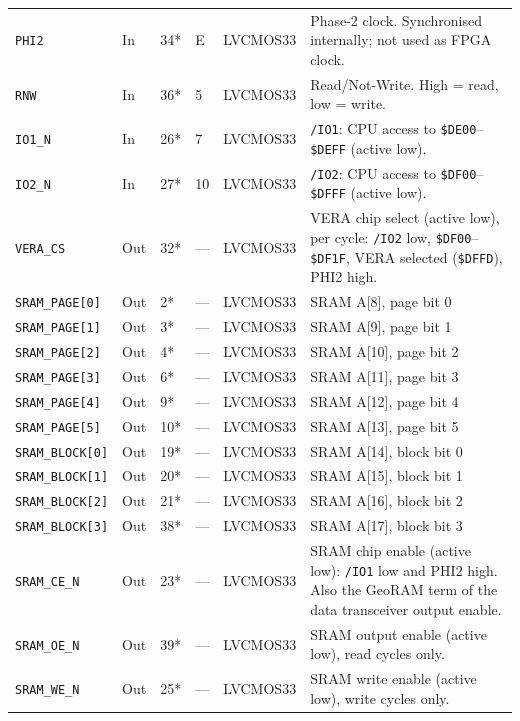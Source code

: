 \documentclass[11pt,a4paper]{article}
\newcommand{\sig}[1]{\texttt{#1}}
\newcommand{\hex}[1]{\texttt{\$#1}}
\begin{document}
\begin{center}
\begin{longtable}{lllllp{4.6cm}}
\sig{PHI2}     & In  & 34* & E  & LVCMOS33 &
    Phase-2 clock. Synchronised internally; not used as FPGA clock. \\
\sig{RNW}      & In  & 36* & 5  & LVCMOS33 &
    Read/Not-Write. High = read, low = write. \\
\sig{IO1\_N}   & In  & 26* & 7  & LVCMOS33 &
    \sig{/IO1}: CPU access to \hex{DE00}--\hex{DEFF} (active low). \\
\sig{IO2\_N}   & In  & 27* & 10 & LVCMOS33 &
    \sig{/IO2}: CPU access to \hex{DF00}--\hex{DFFF} (active low). \\[2pt]

\sig{VERA\_CS} & Out & 32* & --- & LVCMOS33 &
    VERA chip select (active low), per cycle: \sig{/IO2} low,
    \hex{DF00}--\hex{DF1F}, VERA selected (\hex{DFFD}), PHI2 high. \\[2pt]

\sig{SRAM\_PAGE[0]}  & Out &  2* & --- & LVCMOS33 & SRAM A[8], page bit 0 \\
\sig{SRAM\_PAGE[1]}  & Out &  3* & --- & LVCMOS33 & SRAM A[9], page bit 1 \\
\sig{SRAM\_PAGE[2]}  & Out &  4* & --- & LVCMOS33 & SRAM A[10], page bit 2 \\
\sig{SRAM\_PAGE[3]}  & Out &  6* & --- & LVCMOS33 & SRAM A[11], page bit 3 \\
\sig{SRAM\_PAGE[4]}  & Out &  9* & --- & LVCMOS33 & SRAM A[12], page bit 4 \\
\sig{SRAM\_PAGE[5]}  & Out & 10* & --- & LVCMOS33 & SRAM A[13], page bit 5 \\
\sig{SRAM\_BLOCK[0]} & Out & 19* & --- & LVCMOS33 & SRAM A[14], block bit 0 \\
\sig{SRAM\_BLOCK[1]} & Out & 20* & --- & LVCMOS33 & SRAM A[15], block bit 1 \\
\sig{SRAM\_BLOCK[2]} & Out & 21* & --- & LVCMOS33 & SRAM A[16], block bit 2 \\
\sig{SRAM\_BLOCK[3]} & Out & 38* & --- & LVCMOS33 & SRAM A[17], block bit 3 \\
\sig{SRAM\_CE\_N}    & Out & 23* & --- & LVCMOS33 &
    SRAM chip enable (active low): \sig{/IO1} low and PHI2 high.
    Also the GeoRAM term of the data transceiver output enable. \\
\sig{SRAM\_OE\_N}    & Out & 39* & --- & LVCMOS33 &
    SRAM output enable (active low), read cycles only. \\
\sig{SRAM\_WE\_N}    & Out & 25* & --- & LVCMOS33 &
    SRAM write enable (active low), write cycles only. \\

\end{longtable}
\end{center}
\end{document}

